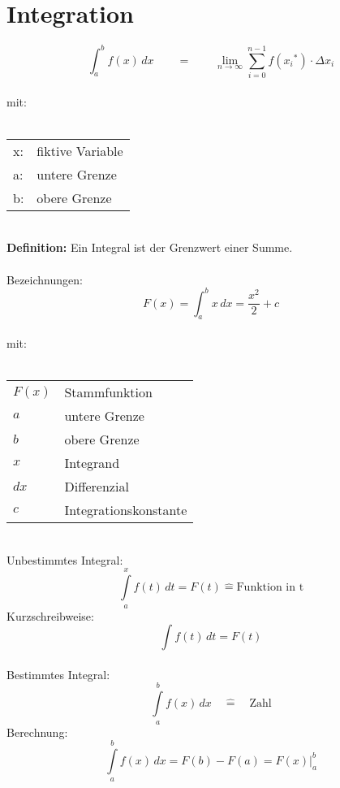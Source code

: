 \section{Integration}
\begin{equation}
\int_a^b f(x)\,dx \qquad = \qquad \lim_{n \rightarrow \infty} \sum_{i=0}^{n-1}f({x_i}^*)\cdot \Delta x_i
\end{equation}
\\
mit: \\
\\
\begin{tabular}{p{1cm} p{10cm}}
x: & fiktive Variable \\
a: & untere Grenze \\
b: & obere Grenze \\
\end{tabular}
\\
\textbf{Definition:} Ein Integral ist der Grenzwert einer Summe. \\
\\
Bezeichnungen:
\begin{equation*}
F(x) = \int_a^b x\,dx = \frac{x^2}{2}+c
\end{equation*}
\\
mit: \\
\\
\begin{tabular}{p{3cm} p{9cm}}
	$F(x)$ & Stammfunktion \\
	$a$ & untere Grenze \\
	$b$ & obere Grenze \\
	$x$ & Integrand \\
	$dx$ & Differenzial \\
	$c$ & Integrationskonstante \\ 
\end{tabular}
\\
Unbestimmtes Integral:
\begin{equation}
	\int\limits_a^x f(t)\,dt = F(t) \hat{=} \text{Funktion in t}
\end{equation}
Kurzschreibweise:
\begin{equation}
	\int f(t)\,dt = F(t)
\end{equation}
\\
Bestimmtes Integral:
\begin{equation}
	\int\limits_a^b f(x)\,dx \quad \hat{=} \quad \text{Zahl}
\end{equation}
Berechnung:
\begin{equation}
	\int\limits_a^b f(x)\,dx = F(b)-F(a) = {F(x)}|_a^b
\end{equation}


